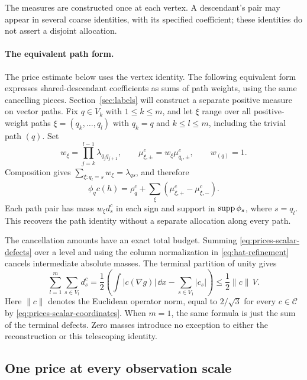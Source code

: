 The measures are constructed once at each vertex. A descendant's
pair may appear in several coarse identities, with its specified
coefficient; these identities do not assert a disjoint allocation.

\paragraph{The equivalent path form.}
The price estimate below uses the vertex identity. The following
equivalent form expresses shared-descendant coefficients as sums of
path weights, using the same cancelling pieces. Section~\ref{sec:labels}
will construct a separate positive measure on vector paths. Fix $q\in V_k$ with $1\le k\le m$, and let $\xi$ range
over all positive-weight paths $\xi=(q_k,\ldots,q_l)$ with
$q_k=q$ and $k\le l\le m$, including the trivial path $(q)$. Set
\[
 w_\xi=\prod_{j=k}^{l-1}\lambda_{q_jq_{j+1}},
 \qquad \mu_{\xi,\pm}^c=w_\xi\mu_{q_l,\pm}^c,
 \qquad w_{(q)}=1.
\]
Composition gives $\sum_{\xi:q_l=s}w_\xi=\lambda_{qs}$, and
therefore
\begin{equation}\label{eq:prices-scalar-pairing}
 \phi_q c(h)=\rho_q^c+
       \sum_\xi(\mu_{\xi,+}^c-\mu_{\xi,-}^c).
\end{equation}
Each path pair has mass $w_\xi d_s^c$ in each sign and support in
$\operatorname{supp}\phi_s$, where $s=q_l$. This recovers the path identity
without a separate allocation along every path.

The cancellation amounts have an exact total budget. Summing
\eqref{eq:prices-scalar-defects} over a level and using the column
normalization in \eqref{eq:hat-refinement} cancels intermediate
absolute masses. The terminal partition of unity gives
\begin{equation}
 \sum_{l=1}^m\sum_{s\in V_l}d_s^c
 =\frac12\left(
       \int|c(\nabla g)|\,\dd x-
       \sum_{s\in V_1}|c_s|\right)
 \le\frac12\|c\|\,V.
 \label{eq:prices-scalar-defect-budget}
\end{equation}
Here $\|c\|$ denotes the Euclidean operator norm, equal to
$2/\sqrt3$ for every $c\in\mathcal C$ by
\eqref{eq:prices-scalar-coordinates}. When $m=1$, the same formula
is just the sum of the terminal defects. Zero masses introduce no
exception to either the reconstruction or this telescoping identity.

\subsection{One price at every observation scale}

